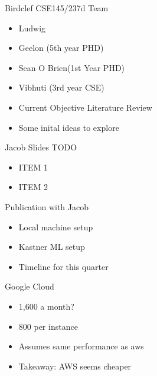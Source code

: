 \begin{frame}{Birdclef CSE145/237d Team}
    \begin{itemize}
        \item Ludwig
        \item Geelon (5th year PHD)
        \item Sean O Brien(1st Year PHD)
        \item Vibhuti (3rd year CSE)
        \item Current Objective Literature Review
        \item Some inital ideas to explore 
    \end{itemize}
\end{frame}

\begin{frame}{Jacob Slides TODO}
    \begin{itemize}
        \item ITEM 1
        \item ITEM 2
    \end{itemize}
\end{frame}

\begin{frame}{Publication with Jacob}
    \begin{itemize}
        \item Local machine setup
        \item Kastner ML setup
        \item Timeline for this quarter
    \end{itemize}
\end{frame}

\begin{frame}{Google Cloud}
    \begin{itemize}
        \item 1,600 a month?
        \item 800 per instance
        \item Assumes same performance as aws
        \item Takeaway: AWS seems cheaper
    \end{itemize}
\end{frame}



